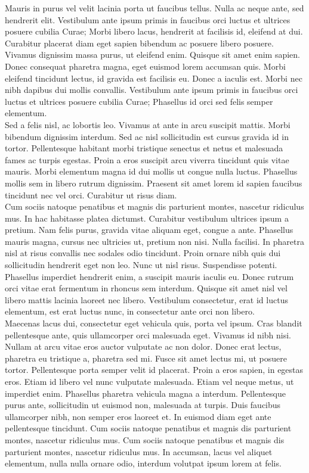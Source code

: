 Mauris in purus vel velit lacinia porta ut faucibus tellus. Nulla ac neque ante, sed hendrerit elit. Vestibulum ante ipsum primis in faucibus orci luctus et ultrices posuere cubilia Curae; Morbi libero lacus, hendrerit at facilisis id, eleifend at dui. Curabitur placerat diam eget sapien bibendum ac posuere libero posuere. Vivamus dignissim massa purus, ut eleifend enim. Quisque sit amet enim sapien. Donec consequat pharetra magna, eget euismod lorem accumsan quis. Morbi eleifend tincidunt lectus, id gravida est facilisis eu. Donec a iaculis est. Morbi nec nibh dapibus dui mollis convallis. Vestibulum ante ipsum primis in faucibus orci luctus et ultrices posuere cubilia Curae; Phasellus id orci sed felis semper elementum.\\

Sed a felis nisl, ac lobortis leo. Vivamus at ante in arcu suscipit mattis. Morbi bibendum dignissim interdum. Sed ac nisl sollicitudin est cursus gravida id in tortor. Pellentesque habitant morbi tristique senectus et netus et malesuada fames ac turpis egestas. Proin a eros suscipit arcu viverra tincidunt quis vitae mauris. Morbi elementum magna id dui mollis ut congue nulla luctus. Phasellus mollis sem in libero rutrum dignissim. Praesent sit amet lorem id sapien faucibus tincidunt nec vel orci. Curabitur ut risus diam.\\

Cum sociis natoque penatibus et magnis dis parturient montes, nascetur ridiculus mus. In hac habitasse platea dictumst. Curabitur vestibulum ultrices ipsum a pretium. Nam felis purus, gravida vitae aliquam eget, congue a ante. Phasellus mauris magna, cursus nec ultricies ut, pretium non nisi. Nulla facilisi. In pharetra nisl at risus convallis nec sodales odio tincidunt. Proin ornare nibh quis dui sollicitudin hendrerit eget non leo. Nunc ut nisl risus. Suspendisse potenti. Phasellus imperdiet hendrerit enim, a suscipit mauris iaculis eu. Donec rutrum orci vitae erat fermentum in rhoncus sem interdum. Quisque sit amet nisl vel libero mattis lacinia laoreet nec libero. Vestibulum consectetur, erat id luctus elementum, est erat luctus nunc, in consectetur ante orci non libero.\\

Maecenas lacus dui, consectetur eget vehicula quis, porta vel ipsum. Cras blandit pellentesque ante, quis ullamcorper orci malesuada eget. Vivamus id nibh nisi. Nullam at arcu vitae eros auctor vulputate ac non dolor. Donec erat lectus, pharetra eu tristique a, pharetra sed mi. Fusce sit amet lectus mi, ut posuere tortor. Pellentesque porta semper velit id placerat. Proin a eros sapien, in egestas eros. Etiam id libero vel nunc vulputate malesuada. Etiam vel neque metus, ut imperdiet enim. Phasellus pharetra vehicula magna a interdum. Pellentesque purus ante, sollicitudin ut euismod non, malesuada at turpis. Duis faucibus ullamcorper nibh, non semper eros laoreet et. In euismod diam eget ante pellentesque tincidunt. Cum sociis natoque penatibus et magnis dis parturient montes, nascetur ridiculus mus. Cum sociis natoque penatibus et magnis dis parturient montes, nascetur ridiculus mus. In accumsan, lacus vel aliquet elementum, nulla nulla ornare odio, interdum volutpat ipsum lorem at felis.\\

